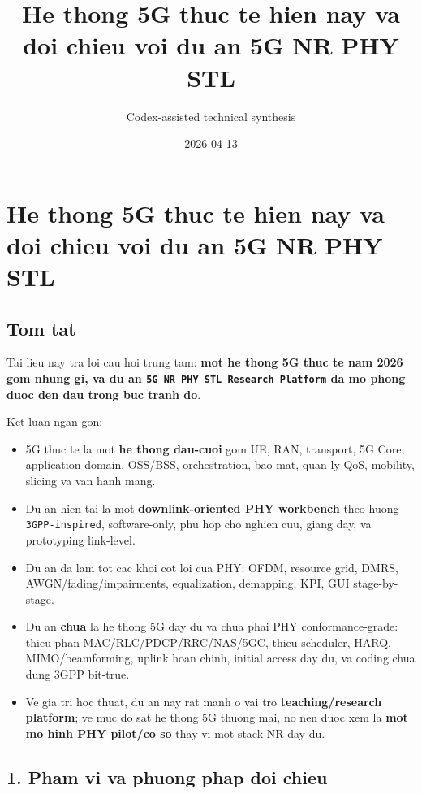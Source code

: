 \documentclass[
  vietnamese,
  a4paper,
  11pt]{article}
\title{He thong 5G thuc te hien nay va doi chieu voi du an 5G NR PHY
STL}
\author{Codex-assisted technical synthesis}
\date{2026-04-13}
\providecommand{\tightlist}{%
  \setlength{\itemsep}{0pt}\setlength{\parskip}{0pt}}
\begin{document}
\maketitle

{
\setcounter{tocdepth}{3}
\tableofcontents
}
\section{He thong 5G thuc te hien nay va doi chieu voi du an 5G NR PHY
STL}\label{he-thong-5g-thuc-te-hien-nay-va-doi-chieu-voi-du-an-5g-nr-phy-stl}

\subsection{Tom tat}\label{tom-tat}

Tai lieu nay tra loi cau hoi trung tam: \textbf{mot he thong 5G thuc te
nam 2026 gom nhung gi, va du an
\texttt{5G\ NR\ PHY\ STL\ Research\ Platform} da mo phong duoc den dau
trong buc tranh do}.

Ket luan ngan gon:

\begin{itemize}
\tightlist
\item
  5G thuc te la mot \textbf{he thong dau-cuoi} gom UE, RAN, transport,
  5G Core, application domain, OSS/BSS, orchestration, bao mat, quan ly
  QoS, mobility, slicing va van hanh mang.
\item
  Du an hien tai la mot \textbf{downlink-oriented PHY workbench} theo
  huong \texttt{3GPP-inspired}, software-only, phu hop cho nghien cuu,
  giang day, va prototyping link-level.
\item
  Du an da lam tot cac khoi cot loi cua PHY: OFDM, resource grid, DMRS,
  AWGN/fading/impairments, equalization, demapping, KPI, GUI
  stage-by-stage.
\item
  Du an \textbf{chua} la he thong 5G day du va chua phai PHY
  conformance-grade: thieu phan MAC/RLC/PDCP/RRC/NAS/5GC, thieu
  scheduler, HARQ, MIMO/beamforming, uplink hoan chinh, initial access
  day du, va coding chua dung 3GPP bit-true.
\item
  Ve gia tri hoc thuat, du an nay rat manh o vai tro
  \textbf{teaching/research platform}; ve muc do sat he thong 5G thuong
  mai, no nen duoc xem la \textbf{mot mo hinh PHY pilot/co so} thay vi
  mot stack NR day du.
\end{itemize}

\subsection{1. Pham vi va phuong phap doi
chieu}\label{pham-vi-va-phuong-phap-doi-chieu}
\end{document}
